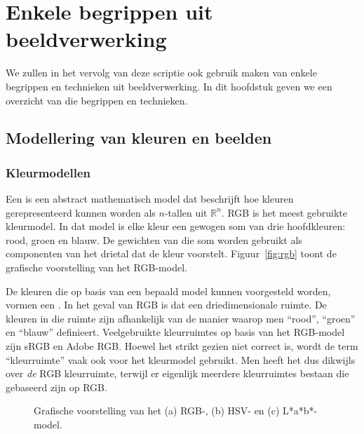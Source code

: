 \chapter{Enkele begrippen uit beeldverwerking}

We zullen in het vervolg van deze scriptie ook gebruik maken van enkele
begrippen en technieken uit beeldverwerking. In dit hoofdstuk geven we 
een overzicht van die begrippen en technieken.

\section{Modellering van kleuren en beelden}

\subsection{Kleurmodellen}

Een  is een abstract mathematisch model dat beschrijft hoe kleuren gerepresenteerd 
kunnen worden als $n$-tallen uit $\mathbb{R}^n$. RGB is het meest gebruikte kleurmodel. In dat model is elke kleur
een gewogen som van drie hoofdkleuren: rood, groen en blauw. De gewichten van die som
worden gebruikt als componenten van het drietal dat de kleur voorstelt. Figuur~\ref{fig:rgb}
toont de grafische voorstelling van het RGB-model.

De kleuren die op basis van een bepaald model kunnen voorgesteld worden, vormen een . 
In het geval van RGB is dat een driedimensionale ruimte. De kleuren in die ruimte zijn afhankelijk
van de manier waarop men ``rood'', ``groen'' en ``blauw'' definieert. Veelgebruikte kleurruimtes 
op basis van het RGB-model zijn sRGB en Adobe RGB.
Hoewel het strikt gezien niet correct is, wordt de term ``kleurruimte'' vaak ook voor het
kleurmodel gebruikt. Men heeft het dus dikwijls over \emph{de} RGB kleurruimte, terwijl er eigenlijk meerdere
kleurruimtes bestaan die gebaseerd zijn op RGB. 

\begin{figure}[bp]
\vspace{10pt}
\centering
{}
\qquad
{}
\qquad
{}
\caption{\label{fig:kleurmodellen}Grafische voorstelling van het (a) RGB-, 
(b) HSV- en (c) L*a*b*-model.}
\end{figure}

